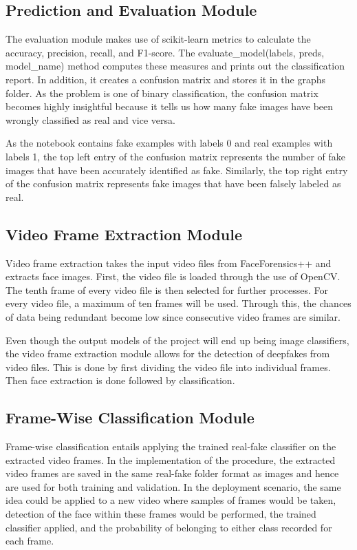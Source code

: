 \documentclass[12pt,a4paper]{report}
\begin{document}
\subsection{Prediction and Evaluation Module}

The evaluation module makes use of scikit-learn metrics to calculate the accuracy, precision, recall, and F1-score. The evaluate\_model(labels, preds, model\_name) method computes these measures and prints out the classification report. In addition, it creates a confusion matrix and stores it in the graphs folder. As the problem is one of binary classification, the confusion matrix becomes highly insightful because it tells us how many fake images have been wrongly classified as real and vice versa.

As the notebook contains fake examples with labels 0 and real examples with labels 1, the top left entry of the confusion matrix represents the number of fake images that have been accurately identified as fake. Similarly, the top right entry of the confusion matrix represents fake images that have been falsely labeled as real.

\subsection{Video Frame Extraction Module}

Video frame extraction takes the input video files from FaceForensics++ and extracts face images. First, the video file is loaded through the use of OpenCV. The tenth frame of every video file is then selected for further processes. For every video file, a maximum of ten frames will be used. Through this, the chances of data being redundant become low since consecutive video frames are similar.

Even though the output models of the project will end up being image classifiers, the video frame extraction module allows for the detection of deepfakes from video files. This is done by first dividing the video file into individual frames. Then face extraction is done followed by classification.

\subsection{Frame-Wise Classification Module}

Frame-wise classification entails applying the trained real-fake classifier on the extracted video frames. In the implementation of the procedure, the extracted video frames are saved in the same real-fake folder format as images and hence are used for both training and validation. In the deployment scenario, the same idea could be applied to a new video where samples of frames would be taken, detection of the face within these frames would be performed, the trained classifier applied, and the probability of belonging to either class recorded for each frame.
\end{document}
